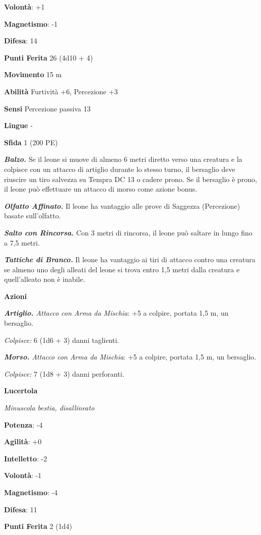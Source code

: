 \begin{multicols}{2}
\textbf{Volontà}: +1

\textbf{Magnetismo}: -1

\textbf{Difesa}: 14

\textbf{Punti Ferita} 26 (4d10 + 4)

\textbf{Movimento} 15 m

\textbf{Abilità} Furtività +6, Percezione +3

\textbf{Sensi} Percezione passiva 13

\textbf{Lingue} -

\textbf{Sfida} 1 (200 PE)

\emph{\textbf{Balzo.}} Se il leone si muove di almeno 6 metri diretto
verso una creatura e la colpisce con un attacco di artiglio durante lo
stesso turno, il bersaglio deve riuscire un tiro salvezza su Tempra DC 13
o cadere prono. Se il bersaglio è prono, il leone può effettuare un
attacco di morso come azione bonus.

\emph{\textbf{Olfatto Affinato.}} Il leone ha vantaggio alle prove di
Saggezza (Percezione) basate sull'olfatto.

\emph{\textbf{Salto con Rincorsa.}} Con 3 metri di rincorsa, il leone
può saltare in lungo fino a 7,5 metri.

\emph{\textbf{Tattiche di Branco.}} Il leone ha vantaggio ai tiri di
attacco contro una creatura se almeno uno degli alleati del leone si
trova entro 1,5 metri dalla creatura e quell'alleato non è inabile.

\textbf{Azioni}

\emph{\textbf{Artiglio.} Attacco con Arma da Mischia}: +5 a colpire,
portata 1,5 m, un bersaglio.

\emph{Colpisce:} 6 (1d6 + 3) danni taglienti.

\emph{\textbf{Morso.} Attacco con Arma da Mischia}: +5 a colpire,
portata 1,5 m, un bersaglio.

\emph{Colpisce:} 7 (1d8 + 3) danni perforanti.

\textbf{Lucertola}

\emph{Minuscola bestia, disallineato}

\textbf{Potenza}: -4

\textbf{Agilità}: +0

\textbf{Intelletto}: -2

\textbf{Volontà}: -1

\textbf{Magnetismo}: -4

\textbf{Difesa}: 11

\textbf{Punti Ferita} 2 (1d4)


\end{multicols}
